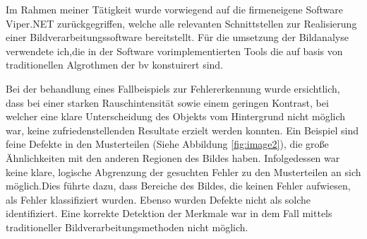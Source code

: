 Im Rahmen meiner Tätigkeit wurde vorwiegend auf die firmeneigene Software Viper.NET \citealp{vipernet_about_nodate} zurückgegriffen, welche alle relevanten Schnittstellen zur Realisierung einer Bildverarbeitungssoftware bereitstellt. Für die umsetzung der Bildanalyse verwendete ich,die in der Software vorimplementierten Tools die auf basis von traditionellen Algrothmen der \gls{bv} konstuirert sind. 

Bei der behandlung eines Fallbeispiels zur Fehlererkennung wurde ersichtlich, dass bei einer starken Rauschintensität sowie einem geringen Kontrast, bei welcher eine klare Unterscheidung des Objekts vom Hintergrund nicht möglich war, keine zufriedenstellenden Resultate erzielt werden konnten. Ein Beispiel sind feine Defekte in den Musterteilen (Siehe Abbildung \ref{fig:image2}), die große Ähnlichkeiten mit den anderen Regionen des Bildes haben. Infolgedessen war keine klare, logische Abgrenzung der gesuchten Fehler zu den Musterteilen an sich möglich.Dies führte dazu, dass Bereiche des Bildes, die keinen Fehler aufwiesen, als Fehler klassifiziert wurden. Ebenso wurden Defekte nicht als solche identifiziert. Eine korrekte Detektion der Merkmale war in dem Fall mittels traditioneller Bildverarbeitungsmethoden nicht möglich.

